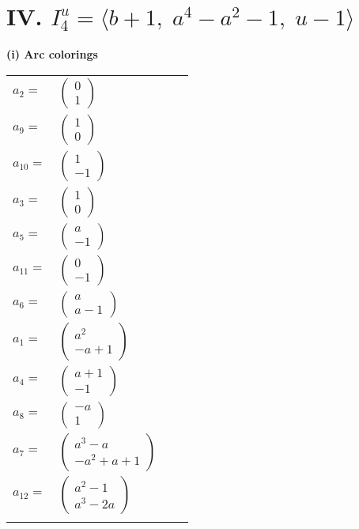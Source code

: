 \documentclass[1p]{elsarticle_modified}
\theoremstyle{definition}
\begin{document}
\centering \section*{IV. $I^u_{4}= \langle b+1,\;a^4- a^2-1,\;u-1 \rangle$}
\flushleft \textbf{(i) Arc colorings}\\
\begin{tabular}{m{7pt} m{180pt} m{7pt} m{180pt} }
\flushright $a_{2}=$&$\begin{pmatrix}0\\1\end{pmatrix}$ \\
\flushright $a_{9}=$&$\begin{pmatrix}1\\0\end{pmatrix}$ \\
\flushright $a_{10}=$&$\begin{pmatrix}1\\-1\end{pmatrix}$ \\
\flushright $a_{3}=$&$\begin{pmatrix}1\\0\end{pmatrix}$ \\
\flushright $a_{5}=$&$\begin{pmatrix}a\\-1\end{pmatrix}$ \\
\flushright $a_{11}=$&$\begin{pmatrix}0\\-1\end{pmatrix}$ \\
\flushright $a_{6}=$&$\begin{pmatrix}a\\a-1\end{pmatrix}$ \\
\flushright $a_{1}=$&$\begin{pmatrix}a^2\\- a+1\end{pmatrix}$ \\
\flushright $a_{4}=$&$\begin{pmatrix}a+1\\-1\end{pmatrix}$ \\
\flushright $a_{8}=$&$\begin{pmatrix}- a\\1\end{pmatrix}$ \\
\flushright $a_{7}=$&$\begin{pmatrix}a^3- a\\- a^2+a+1\end{pmatrix}$ \\
\flushright $a_{12}=$&$\begin{pmatrix}a^2-1\\a^3-2 a\end{pmatrix}$\\&\end{tabular}
\end{document}
